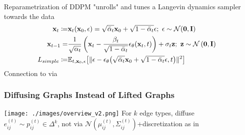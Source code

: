 \documentclass[./presentation.tex]{subfiles}
\begin{document}
\begin{frame}[label=diffusion]
{{  Reparametrization of DDPM \citep{hoDenoisingDiffusionProbabilistic2020f} "unrolls" and tunes a Langevin dynamics sampler towards the data
  \begin{align}
    \rvx_{t}\coloneqq&\func{\rvx_t}{\rvx_0,\mathbf{\epsilon}}=\sqrt{\bar{\alpha}_t}\rvx_0+\sqrt{1-\bar{\alpha}_t}\mathbf{\epsilon};\ \mathbf{\epsilon}\sim\func{\mathcal{N}}{\mathbf{0},\rvI}\nonumber\\
    \rvx_{t-1}=&\frac{1}{\sqrt{\alpha_t}}\left(\rvx_t-\frac{\beta_t}{\sqrt{1-\bar{\alpha}_t}}\func{\mathbf{\epsilon}_\theta}{\rvx_t,t}\right)+\sigma_t\rvz;\ \rvz\sim\mathcal{N}\left(\mathbf{0},\rvI \right)\nonumber\\
    L_{simple}\coloneqq&\mathbb{E}_{t,\rvx_0,\mathbf{\epsilon}}\bigl[ \Vert \mathbf{\epsilon}-\func{\mathbf{\epsilon}_\theta}{\sqrt{\bar{\alpha}_t}\rvx_0+\sqrt{1-\bar{\alpha}_t}\mathbf{\epsilon},t} \Vert^2 \bigr]\nonumber
  \end{align}
  Connection to \cite{niuPermutationInvariantGraph2020b} via \cite{songGenerativeModelingEstimating2019b}
}
}
\end{frame}


\begin{frame}[label=digress,c]
  \frametitle{Diffusing Graphs Instead of Lifted Graphs}
  \texttt{[image: ./images/overview\_v2.png]}
  For $k$ edge types, diffuse $e_{ij}^{(t)} \sim p_{ij}^{(t)}\in\Delta^k$, not via $\mathcal{N}\left(\mu_{ij}^{(t)},\Sigma_{ij}^{(t)}\right)$+discretization as in \cite{hoDenoisingDiffusionProbabilistic2020f}
\end{frame}
\end{document}
